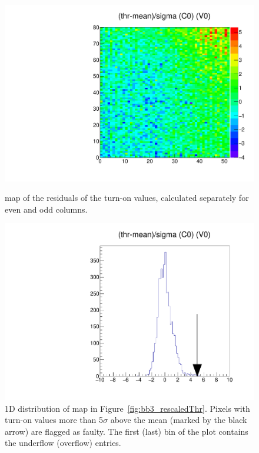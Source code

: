 \begin{figure}[!htp]
\centering
\begin{minipage}{0.45\textwidth}
  \includegraphics[width=1.0\textwidth]{figures/bb3_rescaledThr.pdf}
  \caption{\roc map of the residuals of the \vthrcomp turn-on values, 
  calculated separately for even and odd columns.}
  \label{fig:bb3_rescaledThr}
\end{minipage}
\hspace{0.3cm}
\begin{minipage}{0.45\textwidth}
  \includegraphics[width=1.0\textwidth]{figures/bb3_dist_rescaledThr.pdf}
  \caption{1D distribution of \roc map in Figure~\ref{fig:bb3_rescaledThr}.
  Pixels with turn-on values more than 5$\sigma$ above the \roc mean 
  (marked by the black arrow) are flagged as faulty.
  The first (last) bin of the plot contains the underflow (overflow) entries.}
  \label{fig:bb3_dist_rescaledThr}
\end{minipage}
\end{figure}

